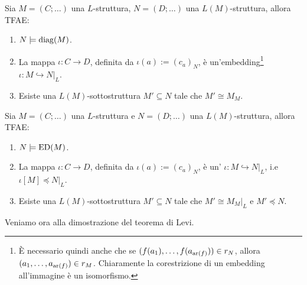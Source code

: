 \begin{remark}
    Sia $M = (C;\ldots)$ una $L$-struttura, $N = (D;\ldots)$ una $L(M)$-struttura, allora TFAE:
    \begin{enumerate}
        \item $N \models \operatorname{diag}(M)$.
        \item La mappa $\iota : C \to D$, definita da $\iota(a) := (c_a)_N$, è un'embedding\footnote{È necessario quindi anche che se $(f(a_1),\ldots, f(a_{\operatorname{ar}(f)})) \in r_N$, allora $(a_1,\ldots,a_{\operatorname{ar}(f)}) \in r_M$. Chiaramente la corestrizione di un embedding all'immagine è un isomorfismo.} $\iota : M \hookrightarrow N|_L$.
        \item Esiste una $L(M)$-sottostruttura $M' \subseteq N$ tale che $M' \cong M_M$.
    \end{enumerate}
\end{remark}

\begin{remark}
    Sia $M = (C;\ldots)$ una $L$-struttura e $N = (D;\ldots)$ una $L(M)$-struttura, allora TFAE:
    \begin{enumerate}
        \item $N \models \operatorname{ED}(M)$.
        \item La mappa $\iota : C \to D$, definita da $\iota(a) := (c_a)_N$, è un' $\iota : M \hookrightarrow N|_L$, i.e $\iota[M] \preceq N|_L$.
        \item Esiste una $L(M)$-sottostruttura $M' \subseteq N$ tale che $M' \cong M_M|_L$ e $M' \preceq N$.
    \end{enumerate}
\end{remark}


Veniamo ora alla dimostrazione del teorema di Levi.

